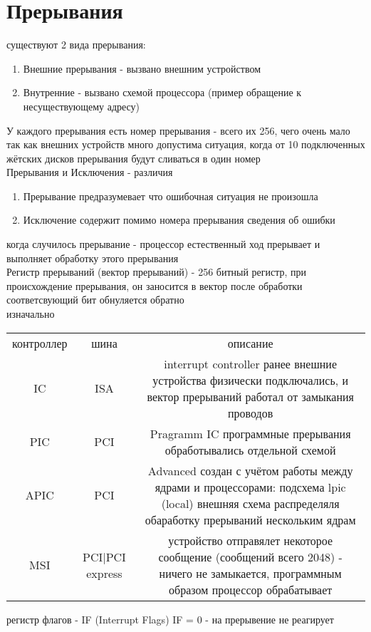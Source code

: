 \documentclass[a4paper, 12pt]{article}
\begin{document}
\section*{Прерывания}
\hypertarget{preriv}{}
существуют 2 вида прерывания:
\begin{enumerate}
    \item Внешние прерывания - вызвано внешним устройством
    \item Внутренние - вызвано схемой процессора (пример обращение к несуществующему адресу)
\end{enumerate}
У каждого прерывания есть номер прерывания - всего их 256, чего очень мало так как внешних устройств много допустима ситуация, когда от 10 подключенных жётских дисков прерывания будут сливаться в один номер \\
Прерывания и Исключения - различия \\
\begin{enumerate}
    \item Прерывание предразумевает что ошибочная ситуация не произошла
    \item Исключение содержит помимо номера прерывания сведения об ошибки
\end{enumerate}
когда случилось прерывание - процессор естественный ход прерывает и выполняет обработку этого прерывания \\
Регистр прерываний (вектор прерываний) - 256 битный регистр, при происхождение прерывания, он заносится в вектор после обработки соответсвующий бит обнуляется обратно \\
изначально\\
\begin{tabular}{c|c|c}
    контроллер & шина & описание\\
    IC & ISA & interrupt controller ранее внешние устройства физически подключались, и вектор прерываний работал от замыкания проводов\\
    PIC & PCI & Pragramm IC программные прерывания обработывались отдельной схемой \\
    APIC & PCI & Advanced создан с учётом работы между ядрами и процессорами: подсхема lpic (local) внешняя схема распределяля обаработку прерываний нескольким ядрам \\
    MSI & PCI|PCI express & устройство отправялет некоторое сообщение (сообщений всего 2048) - ничего не замыкается, программным образом процессор обрабатывает
\end{tabular}
регистр флагов - IF (Interrupt Flags)
IF = 0 - на прерывение не реагирует \\
\end{document}
